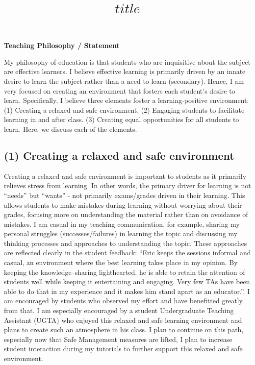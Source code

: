 \documentclass[11pt, a4paper]{article}
\title{$title$}
\begin{document}
\maketitle
\vspace{1em}

{\bf\Large{Teaching Philosophy / Statement}}

\vspace{1em}

My philosophy of education is that students who are inquisitive about the subject are effective learners. I believe effective learning is primarily driven by an innate desire to learn the subject rather than a need to learn (secondary). Hence, I am very focused on creating an environment that fosters each student's desire to learn. Specifically, I believe three elements foster a learning-positive environment: (1) Creating a relaxed and safe environment. (2) Engaging students to facilitate learning in and after class. (3) Creating equal opportunities for all students to learn. Here, we discuss each of the elements.

\subsection{(1) Creating a relaxed and safe environment}
Creating a relaxed and safe environment is important to students as it primarily relieves stress from learning. In other words, the primary driver for learning is not “needs” but “wants” - not primarily exams/grades driven in their learning. This allows students to make mistakes during learning without worrying about their grades, focusing more on understanding the material rather than on avoidance of mistakes. I am casual in my teaching communication, for example, sharing my personal struggles (successes/failures) in learning the topic and discussing my thinking processes and approaches to understanding the topic. These approaches are reflected clearly in the student feedback: “Eric keeps the sessions informal and casual, an environment where the best learning takes place in my opinion. By keeping the knowledge–sharing lighthearted, he is able to retain the attention of students well while keeping it entertaining and engaging. Very few TAs have been able to do that in my experience and it makes him stand apart as an educator.”. I am encouraged by students who observed my effort and have benefitted greatly from that. I am especially encouraged by a student Undergraduate Teaching Assistant (UGTA) who enjoyed this relaxed and safe learning environment and plans to create such an atmosphere in his class. I plan to continue on this path, especially now that Safe Management measures are lifted, I plan to increase student interaction during my tutorials to further support this relaxed and safe environment.
\end{document}
